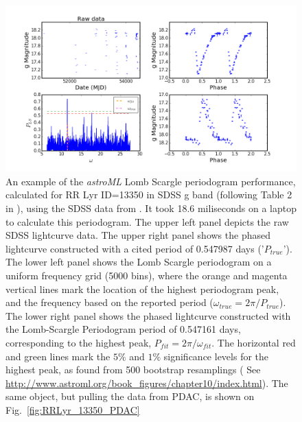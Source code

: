 \documentclass[fleqn,usenatbib]{mnras} %
\begin{document}
\begin{figure}
\includegraphics[width=\textwidth]{figs/Fig_2_RRLyr_LS_periodogram_ID_13350_g}
\caption{ An example of the  {\it astroML} Lomb Scargle periodogram performance,  calculated for RR Lyr ID=13350  in SDSS g band (following Table 2 in \citep{sesar2010}), using the SDSS data from \citep{sesar2010}.  It took 18.6 miliseconds on a laptop to calculate this periodogram. The upper left panel depicts the raw  SDSS lightcurve data. The upper right panel shows the phased lightcurve constructed with a cited period of 0.547987 days ('$P_{true}$'). The lower left panel shows the Lomb Scargle periodogram on  a uniform frequency grid (5000 bins), where the orange and magenta vertical lines mark the location of the highest periodogram peak, and the frequency based on the reported period ($\omega_{true} = 2 \pi / P_{true}$). The lower right panel shows the phased lightcurve constructed with the Lomb-Scargle Periodogram period of 0.547161 days,  corresponding to the highest peak, $P_{fit} = 2 \pi / \omega_{fit}$. The horizontal red and green lines mark the $5\%$ and $1\%$  significance levels for the highest peak, as found from 500 bootstrap resamplings ( See \url{http://www.astroml.org/book\_figures/chapter10/index.html}). The same object, but pulling the data from PDAC, is shown on Fig.~\ref{fig:RRLyr_13350_PDAC} }
\label{fig:RRLyr_13350_Sesar}
\end{figure}
\end{document}
